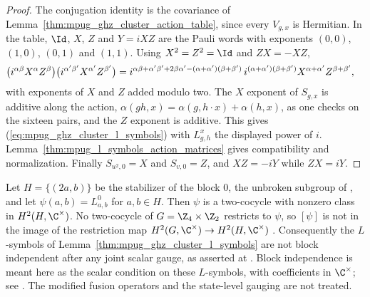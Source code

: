 \begin{proof}\leanok
    The conjugation identity is the covariance of
    Lemma~\ref{thm:mpug_ghz_cluster_action_table}, since every $V_{g,x}$ is
    Hermitian. In the table, $\Id$, $X$, $Z$ and $Y=iXZ$ are the Pauli words
    with exponents $(0,0)$, $(1,0)$, $(0,1)$ and $(1,1)$. Using $X^2=Z^2=\Id$
    and $ZX=-XZ$,
    \begin{align}
        \bigl(i^{\alpha\beta}X^\alpha Z^\beta\bigr)
        \bigl(i^{\alpha'\beta'}X^{\alpha'}Z^{\beta'}\bigr)
         & =i^{\alpha\beta+\alpha'\beta'+2\beta\alpha'
                -(\alpha+\alpha')(\beta+\beta')}\,
        i^{(\alpha+\alpha')(\beta+\beta')}X^{\alpha+\alpha'}Z^{\beta+\beta'},
        \notag
    \end{align}
    with exponents of $X$ and $Z$ added modulo two. The $X$ exponent of
    $S_{g,x}$ is additive along the action,
    $\alpha(gh,x)=\alpha(g,h\cdot x)+\alpha(h,x)$, as one checks on the
    sixteen pairs, and the $Z$ exponent is additive. This gives
    (\ref{eq:mpug_ghz_cluster_l_symbols}) with $L^x_{g,h}$ the displayed power
    of $i$. Lemma~\ref{thm:mpug_l_symbols_action_matrices} gives compatibility
    and normalization. Finally $S_{u^2,0}=X$ and $S_{v,0}=Z$, and
    $XZ=-iY$ while $ZX=iY$.
\end{proof}

\begin{lemma}
    \label{thm:mpug_ghz_cluster_not_block_independent}
    \leanok
    Let $H=\{(2a,b)\}$ be the stabilizer of the block $0$, the unbroken
    subgroup of \cite[line~4489]{FrancoRubio2025MPUGauging}, and let
    $\psi(a,b)=L^0_{a,b}$ for $a,b\in H$. Then $\psi$ is a two-cocycle with
    nonzero class in $H^2(H,\C^\times)$. No two-cocycle of
    $G=\Z_4\times\Z_2$ restricts to $\psi$, so $[\psi]$ is not in the image of
    the restriction map $H^2(G,\C^\times)\to H^2(H,\C^\times)$
    \cite[line~4385]{FrancoRubio2025MPUGauging}. Consequently the $L$-symbols
    of Lemma~\ref{thm:mpug_ghz_cluster_l_symbols} are not block independent
    after any joint scalar gauge, as asserted at
    \cite[line~4490]{FrancoRubio2025MPUGauging}. Block independence is meant
    here as the scalar condition on these $L$-symbols, with coefficients in
    $\C^\times$; see \cite{gap:fbc25_mpu_action_stabilizer_source_audit}. The
    modified fusion operators and the state-level gauging are not treated.
\end{lemma}

